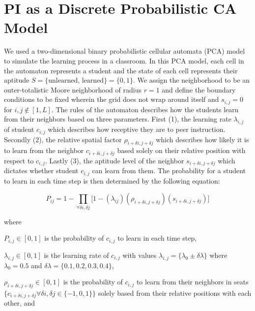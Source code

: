 \section{PI as a Discrete Probabilistic CA Model}

We used a two-dimensional binary probabilistic cellular automata (PCA) model to simulate the learning process in a classroom. In this PCA model, each cell in the automaton represents a student and the state of each cell represents their aptitude $S=\lbrace\text{unlearned, learned}\rbrace=\lbrace 0,1 \rbrace$. We assign the neighborhood to be an outer-totalistic Moore neighborhood of radius $r=1$ and define the boundary conditions to be fixed wherein the grid does not wrap around itself and $s_{i,j} = 0$ for ${i,j \notin [1,L]}$. The rules of the automaton describes how the students learn from their neighbors based on three parameters. First (1), the learning rate $\lambda_{i,j}$ of student $c_{i,j}$ which describes how receptive they are to peer instruction. Secondly (2), the relative spatial factor $\rho_{i+\delta i, j+\delta j}$ which describes how likely it is to learn from the neighbor $c_{i+\delta i, j+\delta j}$ based solely on their relative position with respect to $c_{i,j}$. Lastly (3), the aptitude level of the neighbor $s_{i+\delta i, j+\delta j}$ which dictates whether student $c_{i,j}$ can learn from them. The probability for a student to learn in each time step is then determined by the following equation:

\begin{equation}
    \label{eq:BPCA PI learning probability}
        P_{ij} = 1 - \prod_{\forall \delta i, \delta j}{\lbrack1-(\lambda_{ij})(\rho_{i+\delta i, j+\delta j})(s_{i+\delta i, j+\delta j})}\rbrack
\end{equation}

where

$P_{i,j} \in [0,1]$ is the probability of $c_{i,j}$ to learn in each time step, 

$\lambda_{i,j} \in [0,1]$ is the learning rate of $c_{i,j}$ with values $\lambda_{i,j} = \lbrace \lambda_0 \pm \delta \lambda \rbrace$ where $\lambda_0 = 0.5$ and $\delta \lambda = \lbrace 0.1, 0.2, 0.3, 0.4 \rbrace$, 

$\rho_{i+\delta i, j+\delta j} \in [0,1]$ is the probability of $c_{i,j}$ to learn from their neighbors in seats $\lbrace c_{i+\delta i, j+\delta j} \forall \delta i, \delta j \in \lbrace -1,0,1 \rbrace \rbrace$ solely based from their relative positions with each other, and

